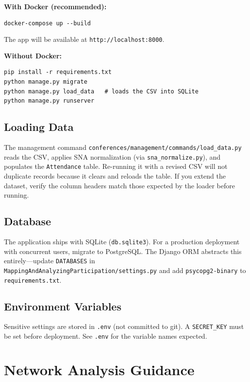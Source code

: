 \documentclass[12pt]{article}
\begin{document}
\textbf{With Docker (recommended):}
\begin{verbatim}
docker-compose up --build
\end{verbatim}
The app will be available at \texttt{http://localhost:8000}.

\textbf{Without Docker:}
\begin{verbatim}
pip install -r requirements.txt
python manage.py migrate
python manage.py load_data   # loads the CSV into SQLite
python manage.py runserver
\end{verbatim}

\subsection{Loading Data}

The management command \texttt{conferences/management/commands/load\_data.py}
reads the CSV, applies SNA normalization (via \texttt{sna\_normalize.py}),
and populates the \texttt{Attendance} table. Re-running it with a revised CSV
will not duplicate records because it clears and reloads the table. If you
extend the dataset, verify the column headers match those expected by the
loader before running.

\subsection{Database}

The application ships with SQLite (\texttt{db.sqlite3}). For a production
deployment with concurrent users, migrate to PostgreSQL. The Django ORM
abstracts this entirely---update \texttt{DATABASES} in
\texttt{MappingAndAnalyzingParticipation/settings.py} and add
\texttt{psycopg2-binary} to \texttt{requirements.txt}.

\subsection{Environment Variables}

Sensitive settings are stored in \texttt{.env} (not committed to git).
A \texttt{SECRET\_KEY} must be set before deployment. See \texttt{.env}
for the variable names expected.

\section{Network Analysis Guidance}
\end{document}
